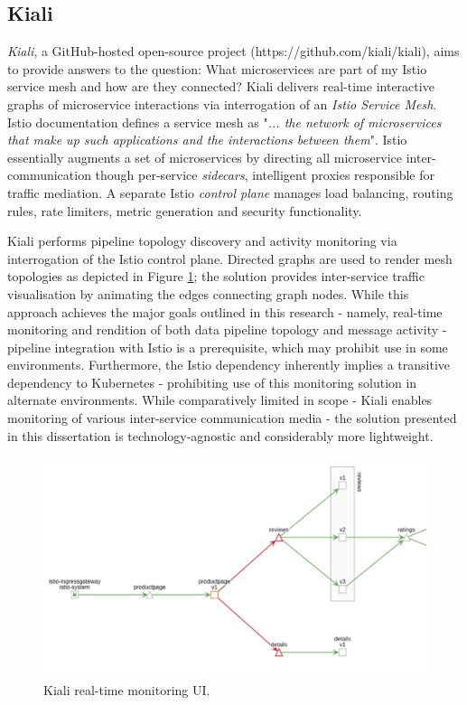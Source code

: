 \subsection{Kiali}

\textit{Kiali}, a GitHub-hosted open-source project (https://github.com/kiali/kiali), aims to provide answers to the question: What microservices are part of my Istio service mesh and how are they connected\cite{kiali_online}? Kiali delivers real-time interactive graphs of microservice interactions via interrogation of an \textit{Istio Service Mesh}. Istio documentation defines a service mesh as "\textit{... the network of microservices that make up such applications and the interactions between them}"\cite{Istio_mesh_online}. Istio essentially augments a set of microservices by directing all microservice inter-communication though per-service \textit{sidecars}, intelligent proxies responsible for traffic mediation. A separate Istio \textit{control plane} manages load balancing, routing rules, rate limiters, metric generation and security functionality\cite{Istio_mesh_online}.

Kiali performs pipeline topology discovery and activity monitoring via interrogation of the Istio control plane. Directed graphs are used to render mesh topologies as depicted in Figure \ref{kiali_monitor_ui}; the solution provides inter-service traffic visualisation by animating the edges connecting graph nodes. While this approach achieves the major goals outlined in this research - namely, real-time monitoring and rendition of both data pipeline topology and message activity - pipeline integration with Istio is a prerequisite, which may prohibit use in some environments. Furthermore, the Istio dependency inherently implies a transitive dependency to Kubernetes - prohibiting use of this monitoring solution in alternate environments. While comparatively limited in scope - Kiali enables monitoring of various inter-service communication media - the solution presented in this dissertation is technology-agnostic and considerably more lightweight.

\begin{figure}[H]
	\centering  
	\includegraphics[scale=1.4]{figures/background/kiali.png}
	\caption{Kiali real-time monitoring UI.}
	\label{kiali_monitor_ui}
\end{figure}


